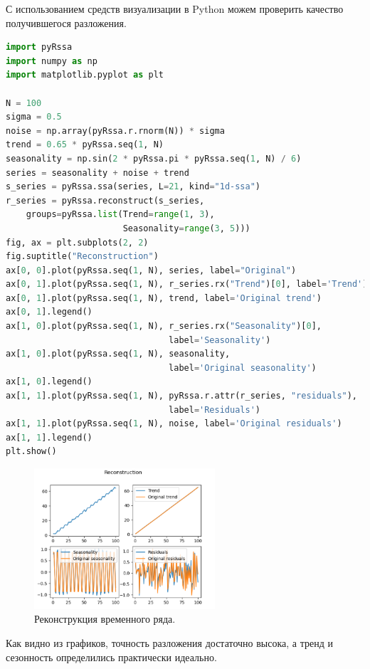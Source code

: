 \documentclass[specialist,
			   substylefile = spbu_report.rtx,
			   subf,href,colorlinks=true, 12pt]{disser}
\begin{document}
С использованием средств визуализации в Python можем проверить качество получившегося разложения.

\begin{lstlisting}[language=Python, caption=Программный код для визуализации компонентов временного ряда на Python.]
import pyRssa
import numpy as np
import matplotlib.pyplot as plt

N = 100
sigma = 0.5
noise = np.array(pyRssa.r.rnorm(N)) * sigma
trend = 0.65 * pyRssa.seq(1, N)
seasonality = np.sin(2 * pyRssa.pi * pyRssa.seq(1, N) / 6)
series = seasonality + noise + trend
s_series = pyRssa.ssa(series, L=21, kind="1d-ssa")
r_series = pyRssa.reconstruct(s_series, 
    groups=pyRssa.list(Trend=range(1, 3), 
                       Seasonality=range(3, 5)))
fig, ax = plt.subplots(2, 2)
fig.suptitle("Reconstruction")
ax[0, 0].plot(pyRssa.seq(1, N), series, label="Original")
ax[0, 1].plot(pyRssa.seq(1, N), r_series.rx("Trend")[0], label='Trend')
ax[0, 1].plot(pyRssa.seq(1, N), trend, label='Original trend')
ax[0, 1].legend()
ax[1, 0].plot(pyRssa.seq(1, N), r_series.rx("Seasonality")[0], 
                                label='Seasonality')
ax[1, 0].plot(pyRssa.seq(1, N), seasonality,
                                label='Original seasonality')
ax[1, 0].legend()
ax[1, 1].plot(pyRssa.seq(1, N), pyRssa.r.attr(r_series, "residuals"),
                                label='Residuals')
ax[1, 1].plot(pyRssa.seq(1, N), noise, label='Original residuals')
ax[1, 1].legend()
plt.show()	
\end{lstlisting}

\begin{figure}[H]
	\centering
	\includegraphics[width=0.6\textwidth]{py_plot_ts_rec.png}
	\caption{Реконструкция временного ряда.}
	\label{fig:graph7}
\end{figure}

Как видно из графиков, точность разложения достаточно высока, а тренд и сезонность определились практически идеально. 
\end{document}
